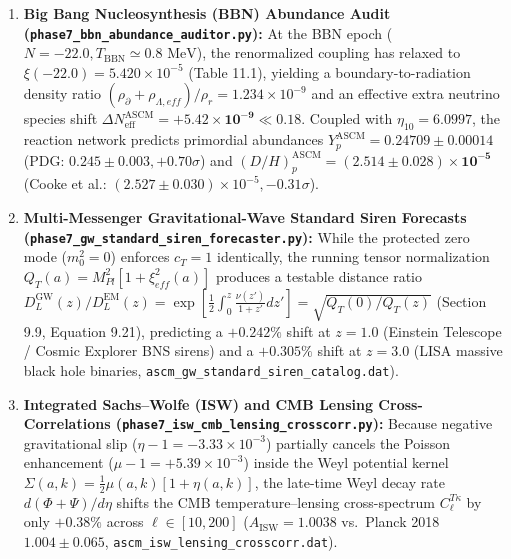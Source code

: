 \documentclass[aps,prd,onecolumn,superscriptaddress,nofootinbib,longbibliography,10pt]{revtex4-2}
\begin{document}
\begin{enumerate}
  
\item \textbf{Big Bang Nucleosynthesis (BBN) Abundance Audit (\texttt{phase7_bbn_abundance_auditor.py}):} At the BBN epoch (\(N = -22.0, T_{\mathrm{BBN}} \simeq 0.8\text{ MeV}\)), the renormalized coupling has relaxed to \(\xi(-22.0) = 5.420 \times 10^{-5}\) (Table 11.1), yielding a boundary-to-radiation density ratio \((\rho_{\partial} + \rho_{\Lambda,eff})/\rho_r = 1.234 \times 10^{-9}\) and an effective extra neutrino species shift \(\Delta N_{\mathrm{eff}}^{\mathrm{ASCM}} = \mathbf{+5.42 \times 10^{-9}} \ll 0.18\). Coupled with \(\eta_{10} = 6.0997\), the reaction network predicts primordial abundances \(Y_p^{\mathrm{ASCM}} = \mathbf{0.24709 \pm 0.00014}\) (PDG: \(0.245 \pm 0.003, +0.70\sigma\)) and \((D/H)_p^{\mathrm{ASCM}} = \mathbf{(2.514 \pm 0.028) \times 10^{-5}}\) (Cooke et al.: \((2.527 \pm 0.030) \times 10^{-5}, -0.31\sigma\)).
  
\item \textbf{Multi-Messenger Gravitational-Wave Standard Siren Forecasts (\texttt{phase7_gw_standard_siren_forecaster.py}):} While the protected zero mode (\(m_0^2 = 0\)) enforces \(c_T = 1\) identically, the running tensor normalization \(Q_T(a) = M_{Pl}^2[1 + \xi_{eff}^2(a)]\) produces a testable distance ratio \(D_L^{\mathrm{GW}}(z)/D_L^{\mathrm{EM}}(z) = \exp\left[\frac{1}{2}\int_0^z \frac{\nu(z')}{1+z'}dz'\right] = \sqrt{Q_T(0)/Q_T(z)}\) (Section 9.9, Equation 9.21), predicting a \(+0.242\%\) shift at \(z = 1.0\) (Einstein Telescope / Cosmic Explorer BNS sirens) and a \(+0.305\%\) shift at \(z = 3.0\) (LISA massive black hole binaries, \texttt{ascm_gw_standard_siren_catalog.dat}).
  
\item \textbf{Integrated Sachs–Wolfe (ISW) and CMB Lensing Cross-Correlations (\texttt{phase7_isw_cmb_lensing_crosscorr.py}):} Because negative gravitational slip (\(\eta - 1 = -3.33 \times 10^{-3}\)) partially cancels the Poisson enhancement (\(\mu - 1 = +5.39 \times 10^{-3}\)) inside the Weyl potential kernel \(\Sigma(a,k) = \frac{1}{2}\mu(a,k)[1 + \eta(a,k)]\), the late-time Weyl decay rate \(d(\Phi+\Psi)/d\eta\) shifts the CMB temperature–lensing cross-spectrum \(C_\ell^{T\kappa}\) by only \(+0.38\%\) across \(\ell \in [10, 200]\) (\(A_{\mathrm{ISW}} = 1.0038\) vs.\ Planck 2018 \(1.004 \pm 0.065\), \texttt{ascm_isw_lensing_crosscorr.dat}).
  

\end{enumerate}
\end{document}
